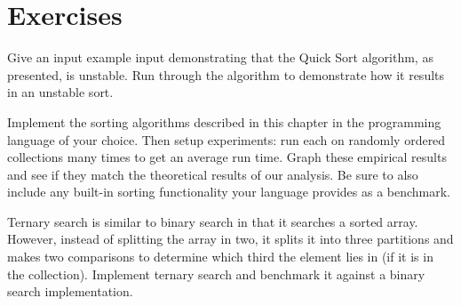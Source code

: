 

\section{Exercises}

\begin{exer}
Give an input example input demonstrating that the Quick Sort algorithm, as 
presented, is unstable.  Run through the algorithm to demonstrate how it 
results in an unstable sort.
\end{exer}


\begin{exer}
Implement the sorting algorithms described in this chapter in the programming
language of your choice.  Then setup experiments: run each on randomly 
ordered collections many times to get an average run time.  Graph these
empirical results and see if they match the theoretical results of
our analysis.  Be sure to also include any built-in sorting functionality
your language provides as a benchmark.
\end{exer}

\begin{exer}
Ternary search is similar to binary search in that it searches a sorted
array.  However, instead of splitting the array in two, it splits it into
three partitions and makes two comparisons to determine which third the
element lies in (if it is in the collection).  Implement ternary search and 
benchmark it against a binary search implementation.
\end{exer}

